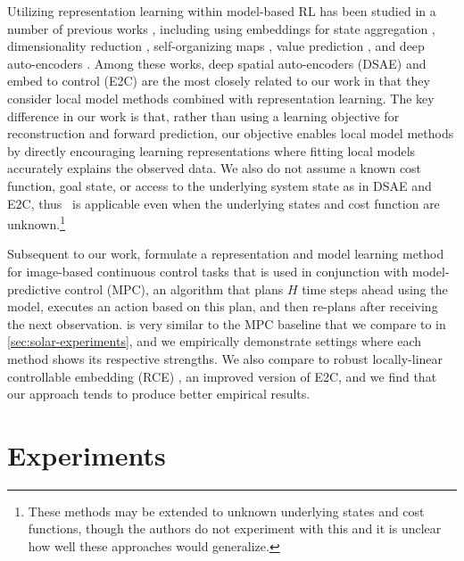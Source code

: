 Utilizing representation learning within model-based RL has been studied in a number of previous works \citep{srl-survey}, including using embeddings for state aggregation \citep{soft-state-aggregation}, dimensionality reduction \citep{dimension-reduction}, self-organizing maps \citep{self-organizing-map}, value prediction \citep{vpn}, and deep auto-encoders \citep{ae-nn,darla}. Among these works, deep spatial auto-encoders (DSAE) \citep{spatial-ae} and embed to control (E2C) \citep{e2c,rce} are the most closely related to our work in that they consider local model methods combined with representation learning. The key difference in our work is that, rather than using a learning objective for reconstruction and forward prediction, our objective enables local model methods by directly encouraging learning representations where fitting local models accurately explains the observed data. We also do not assume a known cost function, goal state, or access to the underlying system state as in DSAE and E2C, thus \metabbr\ is applicable even when the underlying states and cost function are unknown.\footnote{These methods may be extended to unknown underlying states and cost functions, though the authors do not experiment with this and it is unclear how well these approaches would generalize.}

Subsequent to our work, \citet{planet} formulate a representation and model learning method for image-based continuous control tasks that is used in conjunction with model-predictive control (MPC), an algorithm that plans $H$ time steps ahead using the model, executes an action based on this plan, and then re-plans after receiving the next observation. \citet{planet} is very similar to the MPC baseline that we compare to in \autoref{sec:solar-experiments}, and we empirically demonstrate settings where each method shows its respective strengths. We also compare to robust locally-linear controllable embedding (RCE) \citep{rce}, an improved version of E2C, and we find that our approach tends to produce better empirical results.


\section{Experiments}
\label{sec:solar-experiments}

